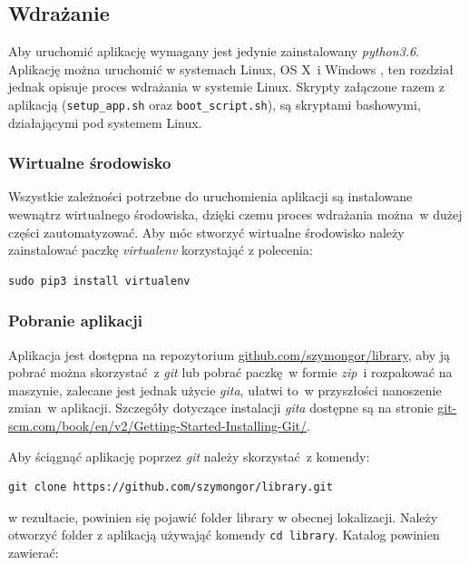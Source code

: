 \documentclass[twoside]{projektInzynierskiMS}
\begin{document}
\subsection{Wdrażanie}
Aby uruchomić aplikację wymagany jest jedynie zainstalowany \textit{python3.6}. Aplikację można uruchomić w systemach Linux, OS X~i Windows \cite[s. 140]{djangobook}, ten rozdział jednak opisuje proces wdrażania w systemie Linux. Skrypty załączone razem z aplikacją (\verb`setup_app.sh` oraz \verb`boot_script.sh`), są skryptami bashowymi, działającymi pod systemem Linux. 

\subsubsection{Wirtualne środowisko}
Wszystkie zależności potrzebne do uruchomienia aplikacji są instalowane wewnątrz wirtualnego środowiska, dzięki czemu proces wdrażania można~w dużej części zautomatyzować. Aby móc stworzyć wirtualne środowisko należy zainstalować paczkę \textit{virtualenv} korzystająć z polecenia:
\begin{verbatim}
sudo pip3 install virtualenv
\end{verbatim}


\subsubsection{Pobranie aplikacji}

Aplikacja jest dostępna na repozytorium \href{https://github.com/szymongor/library}{github.com/szymongor/library}, aby ją pobrać można skorzystać~z \textit{git} lub pobrać paczkę~w formie \textit{zip}~i rozpakować na maszynie, zalecane jest jednak użycie \textit{gita}, ułatwi to~w przyszłości nanoszenie zmian~w aplikacji. Szczegóły dotyczące instalacji \textit{gita} dostępne są na stronie \href{https://git-scm.com/book/en/v2/Getting-Started-Installing-Git/}{git-scm.com/book/en/v2/Getting-Started-Installing-Git/}. 

Aby ściągnąć aplikację poprzez \textit{git} należy skorzystać~z komendy:

\begin{verbatim}
git clone https://github.com/szymongor/library.git
\end{verbatim}
w rezultacie, powinien się pojawić folder library w obecnej lokalizacji. Należy otworzyć folder z aplikacją używająć komendy \verb`cd library`. Katalog powinien zawierać:
\end{document}
